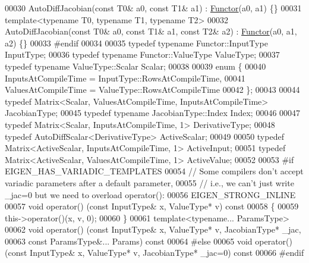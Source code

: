 \begin{DoxyCode}
00030   AutoDiffJacobian(\textcolor{keyword}{const} T0& a0, \textcolor{keyword}{const} T1& a1) : \hyperlink{struct_functor}{Functor}(a0, a1) \{\}
00031   \textcolor{keyword}{template}<\textcolor{keyword}{typename} T0, \textcolor{keyword}{typename} T1, \textcolor{keyword}{typename} T2>
00032   AutoDiffJacobian(\textcolor{keyword}{const} T0& a0, \textcolor{keyword}{const} T1& a1, \textcolor{keyword}{const} T2& a2) : \hyperlink{struct_functor}{Functor}(a0, a1, a2) \{\}
00033 \textcolor{preprocessor}{#endif}
00034 
00035   \textcolor{keyword}{typedef} \textcolor{keyword}{typename} Functor::InputType InputType;
00036   \textcolor{keyword}{typedef} \textcolor{keyword}{typename} Functor::ValueType ValueType;
00037   \textcolor{keyword}{typedef} \textcolor{keyword}{typename} ValueType::Scalar Scalar;
00038 
00039   \textcolor{keyword}{enum} \{
00040     InputsAtCompileTime = InputType::RowsAtCompileTime,
00041     ValuesAtCompileTime = ValueType::RowsAtCompileTime
00042   \};
00043 
00044   \textcolor{keyword}{typedef} Matrix<Scalar, ValuesAtCompileTime, InputsAtCompileTime> JacobianType;
00045   \textcolor{keyword}{typedef} \textcolor{keyword}{typename} JacobianType::Index Index;
00046 
00047   \textcolor{keyword}{typedef} Matrix<Scalar, InputsAtCompileTime, 1> DerivativeType;
00048   \textcolor{keyword}{typedef} AutoDiffScalar<DerivativeType> ActiveScalar;
00049 
00050   \textcolor{keyword}{typedef} Matrix<ActiveScalar, InputsAtCompileTime, 1> ActiveInput;
00051   \textcolor{keyword}{typedef} Matrix<ActiveScalar, ValuesAtCompileTime, 1> ActiveValue;
00052 
00053 \textcolor{preprocessor}{#if EIGEN\_HAS\_VARIADIC\_TEMPLATES}
00054   \textcolor{comment}{// Some compilers don't accept variadic parameters after a default parameter,}
00055   \textcolor{comment}{// i.e., we can't just write \_jac=0 but we need to overload operator():}
00056   EIGEN\_STRONG\_INLINE
00057   \textcolor{keywordtype}{void} operator() (\textcolor{keyword}{const} InputType& x, ValueType* v)\textcolor{keyword}{ const}
00058 \textcolor{keyword}{  }\{
00059       this->operator()(x, v, 0);
00060   \}
00061   \textcolor{keyword}{template}<\textcolor{keyword}{typename}... ParamsType>
00062   \textcolor{keywordtype}{void} operator() (\textcolor{keyword}{const} InputType& x, ValueType* v, JacobianType* \_jac,
00063                    \textcolor{keyword}{const} ParamsType&... Params) \textcolor{keyword}{const}
00064 \textcolor{preprocessor}{#else}
00065   \textcolor{keywordtype}{void} operator() (\textcolor{keyword}{const} InputType& x, ValueType* v, JacobianType* \_jac=0) const
00066 \textcolor{preprocessor}{#endif}

\end{DoxyCode}
